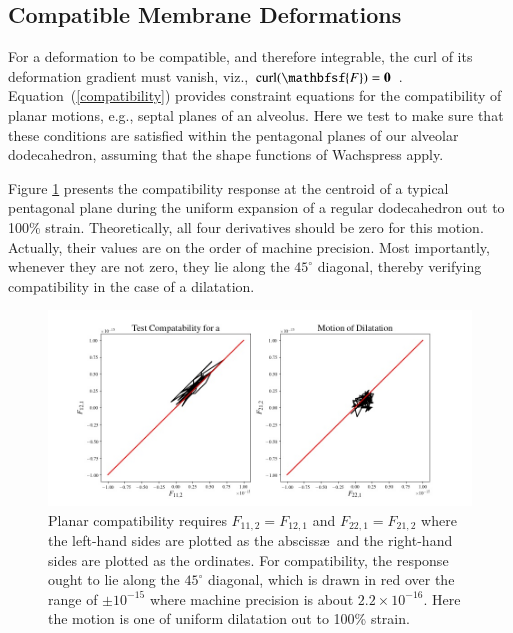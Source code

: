 \subsection{Compatible Membrane Deformations}

For a deformation to be compatible, and therefore integrable, the curl of its deformation gradient must vanish, viz., $\textrm{curl} (\mathbfsf{F}) = \textbf{0}$ \cite{Clayton15}. Equation~(\ref{compatibility}) provides constraint equations for the compatibility of planar motions, e.g., septal planes of an alveolus.  Here we test to make sure that these conditions are satisfied within the pentagonal planes of our alveolar dodecahedron, assuming that the shape functions of Wachspress apply.

Figure \ref{figCompatDilatation} presents the compatibility response at the centroid of a typical pentagonal plane during the uniform expansion of a regular dodecahedron out to 100\% strain.   Theoretically, all four derivatives should be zero for this motion. Actually, their values are on the order of machine precision.  Most importantly, whenever they are not zero, they lie along the $45^{\circ}$ diagonal, thereby verifying compatibility in the case of a dilatation.

\begin{figure}
	\centering
	\includegraphics[width=\textwidth]{figures/compatibilityDilatation.jpg}
	\caption{Planar compatibility requires $F_{11,2} = F_{12,1}$ and $F_{22,1} = F_{21,2}$ where the left-hand sides are plotted as the absciss\ae\ and the right-hand sides are plotted as the ordinates.  For compatibility, the response ought to lie along the $45^{\circ}$ diagonal, which is drawn in red over the range of $\pm 10^{-15}$ where machine precision is about $2.2 \times 10^{-16}$.  Here the motion is one of uniform dilatation out to 100\% strain.}
	\label{figCompatDilatation}
\end{figure}


